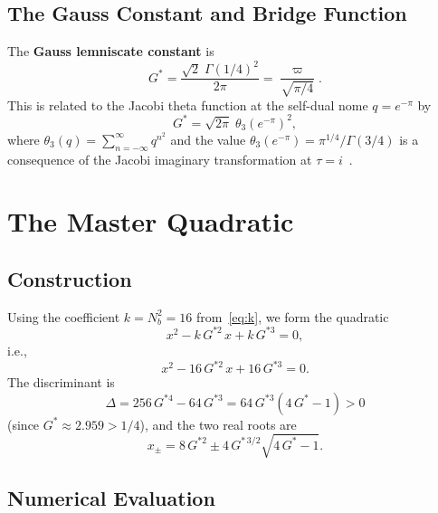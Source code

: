 \documentclass[12pt,a4paper]{article}
\newcommand{\vpi}{\varpi}
\begin{document}
\subsection{The Gauss Constant and Bridge Function}

The \textbf{Gauss lemniscate constant} is
\begin{equation}\label{eq:Gstar}
G^{*} = \frac{\sqrt{2}\;\Gamma(1/4)^{2}}{2\pi} = \frac{\vpi}{\sqrt{\pi/4}}.
\end{equation}
This is related to the Jacobi theta function at the self-dual nome $q = e^{-\pi}$ by
\begin{equation}\label{eq:theta}
G^{*} = \sqrt{2\pi}\;\theta_{3}(e^{-\pi})^{2},
\end{equation}
where $\theta_{3}(q) = \sum_{n=-\infty}^{\infty} q^{n^{2}}$ and the value $\theta_{3}(e^{-\pi}) = \pi^{1/4}/\Gamma(3/4)$ is a consequence of the Jacobi imaginary transformation at $\tau = i$~\cite{WhittakerWatson}.

\section{The Master Quadratic}

\subsection{Construction}

Using the coefficient $k = N_{b}^{2} = 16$ from~\eqref{eq:k}, we form the quadratic
\begin{equation}\label{eq:master}
x^{2} - k\,G^{*2}\,x + k\,G^{*3} = 0,
\end{equation}
i.e.,
\[
x^{2} - 16\,G^{*2}\,x + 16\,G^{*3} = 0.
\]
The discriminant is
\begin{equation}\label{eq:disc}
\Delta = 256\,G^{*4} - 64\,G^{*3} = 64\,G^{*3}(4\,G^{*} - 1) > 0
\end{equation}
(since $G^{*} \approx 2.959 > 1/4$), and the two real roots are
\begin{equation}\label{eq:roots}
x_{\pm} = 8\,G^{*2} \pm 4\,G^{*\,3/2}\sqrt{4\,G^{*} - 1}.
\end{equation}

\subsection{Numerical Evaluation}
\end{document}
